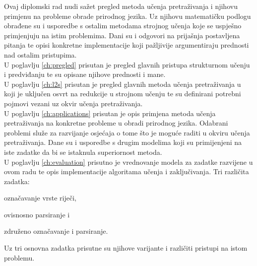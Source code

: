 Ovaj diplomski rad nudi sažet pregled metoda učenja pretraživanja i njihovu
primjenu na probleme obrade prirodnog jezika. Uz njihovu matematičku podlogu
obrađene su i usporedbe s ostalim metodama strojnog učenja koje se uspješno
primjenjuju na istim problemima. Dani su i odgovori na prijašnja postavljena
pitanja te opisi konkretne implementacije koji pažljivije argumentiraju
prednosti nad ostalim pristupima.
\\ \noindent
U poglavlju \ref{ch:pregled} prisutan je pregled glavnih pristupa strukturnom
učenju i predviđanju te su opisane njihove prednosti i mane.
\\ \noindent
U poglavlju \ref{ch:l2s} prisutan je pregled glavnih metoda učenja pretraživanja
u koji je uključen osvrt na redukcije u strojnom učenju te su definirani
potrebni pojmovi vezani uz okvir učenja pretraživanja.
\\ \noindent
U poglavlju \ref{ch:applications} prisutan je opis primjena metoda učenja
pretraživanja na konkretne probleme u obradi prirodnog jezika. Odabrani problemi
služe za razvijanje osjećaja o tome što je moguće raditi u okviru učenja
pretraživanja. Dane su i usporedbe s drugim modelima koji su primijenjeni na
iste zadatke da bi se istaknula superiornost \lts{} metoda.
\\ \noindent
U poglavlju \ref{ch:evaluation} prisutno je vrednovanje modela za zadatke
razvijene u ovom radu te opis implementacije algoritama učenja i zaključivanja.
Tri različita zadatka:
\begin{inlinelist}
  \item označavanje vrste riječi,
  \item ovisnosno parsiranje i
  \item združeno označavanje i parsiranje.
\end{inlinelist}
Uz tri osnovna zadatka prisutne su njihove varijante i različiti pristupi na
istom problemu.
